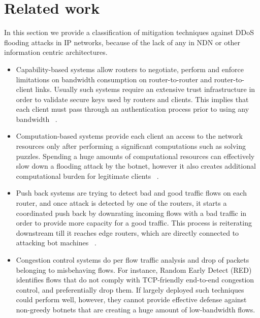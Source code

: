 \section{Related work \label{related-section}}
In this section we provide a classification of mitigation techniques against DDoS flooding attacks in IP networks, because of the lack of any in NDN or other information centric architectures. 
\begin{itemize}
\item{Capability-based systems} allow routers to negotiate, perform and enforce limitations on bandwidth consumption on router-to-router and router-to-client links. Usually such systems require an extensive trust infrastructure in order to validate secure keys used by routers and clients. This implies that each client must pass through an authentication process prior to using any bandwidth ~\cite{Capabilities}.   
\item{Computation-based systems} provide each client an access to the network resources only after performing a significant computations such as solving puzzles. Spending a huge amounts of computational resources can effectively slow down a flooding attack by the botnet, however it also creates additional computational burden for legitimate clients ~\cite{Portcullis}.
\item{Push back systems} are trying to detect bad and good traffic flows on each router, and once attack is detected by one of the routers, it starts a coordinated push back by downrating incoming flows with a bad traffic in order to provide more capacity for a good traffic. This process is reiterating downstream till it reaches edge routers, which are directly connected to attacking bot machines ~\cite{Pushback}. 
\item{Congestion control systems} do per flow traffic analysis and drop of packets belonging to misbehaving flows. For instance, Random Early Detect (RED)~\cite{RED} identifies flows that do not comply with TCP-friendly end-to-end congestion control, and preferentially drop them. If largely deployed such techniques could perform well, however, they cannot provide effective defense against non-greedy botnets that are creating a huge amount of low-bandwidth flows. 
\end{itemize}

